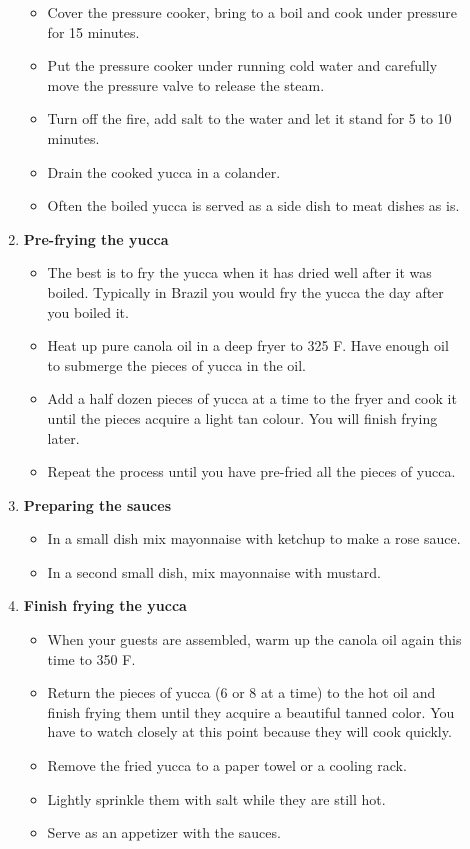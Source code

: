 \documentclass[11pt,letterpaper]{article}
\begin{document}
\begin{description}
\begin{enumerate}
\begin{itemize}
	\item Cover the pressure cooker, bring to a boil and cook under pressure for 15 minutes.
	\item Put the pressure cooker under running cold water and carefully move the pressure valve to release the steam.
	\item Turn off the fire, add salt to the water and let it stand for 5 to 10 minutes.
	\item Drain the cooked yucca in a colander.
	\item Often the boiled yucca is served as a side dish to meat dishes as is. 
	\end{itemize}
\newpage
	\item {\bf Pre-frying the yucca}
	\begin{itemize}
	\item The best is to fry the yucca when it has dried well after it was boiled. Typically in Brazil you would fry the yucca the day after you boiled it.
	\item Heat up pure canola oil in a deep fryer to 325 F. Have enough oil to submerge the pieces of yucca in the oil.
	\item Add a half dozen pieces of yucca at a time to the fryer and cook it until the pieces acquire a light tan colour. You will finish frying later.
	\item Repeat the process until you have pre-fried all the pieces of yucca.
	\end{itemize}
	\item {\bf Preparing the sauces}
	\begin{itemize}
	\item In a small dish mix mayonnaise with ketchup to make a rose sauce.
	\item In a second small dish, mix mayonnaise with mustard.
	\end{itemize}
	\item {\bf Finish frying the yucca}
	\begin{itemize}
	\item When your guests are assembled, warm up the canola oil again this time to 350 F.
	\item Return the pieces of yucca (6 or 8 at a time) to the hot oil and finish frying them until they acquire a beautiful tanned color. You have to watch closely at this point because they will cook quickly. 
	\item Remove the fried yucca to a paper towel or a cooling rack.
	\item Lightly sprinkle them with salt while they are still hot.
	\item Serve as an appetizer with the sauces.
	\end{itemize}
	\end{enumerate}
\end{description}
\end{document}
